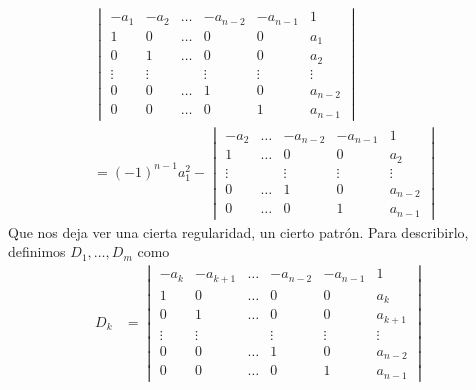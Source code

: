 \documentclass{report}
\theoremstyle{remark}
\begin{document}
  \begin{align}
    &\begin{vmatrix}
      - a_1
      &- a_2
      &\dots
      &- a_{n - 2}
      &- a_{n - 1}
      &1
      \\
      1
      &0
      &\dots
      &0
      &0
      &a_1
      \\
      0
      &1
      &\dots
      &0
      &0
      &a_2
      \\
      \vdots
      &\vdots
      &
      &\vdots
      &\vdots
      &\vdots
      \\
      0
      &0
      &\dots
      &1
      &0
      &a_{n - 2}
      \\
      0
      &0
      &\dots
      &0
      &1
      &a_{n - 1}
    \end{vmatrix}
    \\
    &=
    (- 1)^{n - 1} a_1^2
    -
    \begin{vmatrix}
      - a_2
      &\dots
      &- a_{n - 2}
      &- a_{n - 1}
      &1
      \\
      1
      &\dots
      &0
      &0
      &a_2
      \\
      \vdots
      &
      &\vdots
      &\vdots
      &\vdots
      \\
      0
      &\dots
      &1
      &0
      &a_{n - 2}
      \\
      0
      &\dots
      &0
      &1
      &a_{n - 1}
    \end{vmatrix}
  \end{align}
  Que nos deja ver una cierta regularidad, un cierto patrón.
  Para describirlo, definimos \(D_1, \dots, D_m\) como
  \begin{align}
    D_k
    &=
    \begin{vmatrix}
      - a_k
      &- a_{k + 1}
      &\dots
      &- a_{n - 2}
      &- a_{n - 1}
      &1
      \\
      1
      &0
      &\dots
      &0
      &0
      &a_k
      \\
      0
      &1
      &\dots
      &0
      &0
      &a_{k + 1}
      \\
      \vdots
      &\vdots
      &
      &\vdots
      &\vdots
      &\vdots
      \\
      0
      &0
      &\dots
      &1
      &0
      &a_{n - 2}
      \\
      0
      &0
      &\dots
      &0
      &1
      &a_{n - 1}
    \end{vmatrix}
  \end{align}
\end{document}
